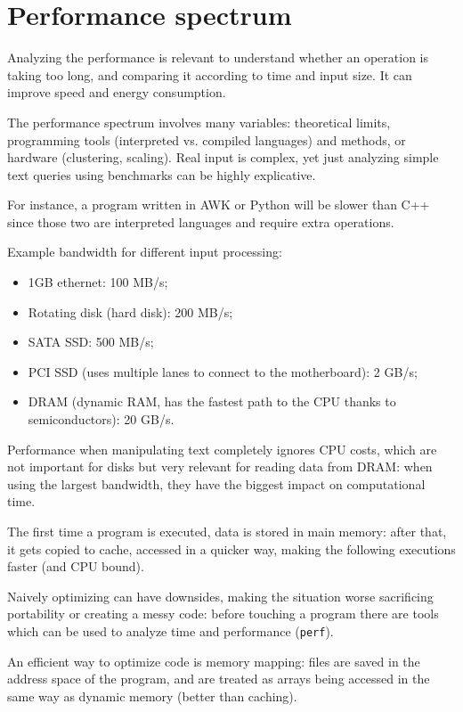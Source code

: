 \section{Performance spectrum}
Analyzing the performance is relevant to understand whether an operation is taking too long, and comparing it according to time and input size. It can improve speed and energy consumption.

The performance spectrum involves many variables: theoretical limits, programming tools (interpreted vs. compiled languages) and methods, or hardware (clustering, scaling). Real input is complex, yet just analyzing simple text queries using benchmarks can be highly explicative.

For instance, a program written in AWK or Python will be slower than C++ since those two are interpreted languages and require extra operations.

Example bandwidth for different input processing:
\begin{itemize}
	\item 1GB ethernet: 100 MB/s;
	\item Rotating disk (hard disk): 200 MB/s;
	\item SATA SSD: 500 MB/s;
	\item PCI SSD (uses multiple lanes to connect to the motherboard): 2 GB/s;
	\item DRAM (dynamic RAM, has the fastest path to the CPU thanks to semiconductors): 20 GB/s.
\end{itemize}

Performance when manipulating text completely ignores CPU costs, which are not important for disks but very relevant for reading data from DRAM: when using the largest bandwidth, they have the biggest impact on computational time.

The first time a program is executed, data is stored in main memory: after that, it gets copied to cache, accessed in a quicker way, making the following executions faster (and CPU bound).

Naively optimizing can have downsides, making the situation worse sacrificing portability or creating a messy code: before touching a program there are tools which can be used to analyze time and performance (\texttt{perf}).

An efficient way to optimize code is memory mapping: files are saved in the address space of the program, and are treated as arrays being accessed in the same way as dynamic memory (better than caching).

